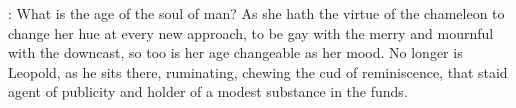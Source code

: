 \documentclass[12pt]{article}
\begin{document}





: What is the age of the soul of man? As she hath the virtue of the
chameleon to change her hue at every new approach, to be gay with the
merry and mournful with the downcast, so too is her age changeable as her
mood. No longer is Leopold, as he sits there, ruminating, chewing the cud
of reminiscence, that staid agent of publicity and holder of a modest
substance in the funds.
\end{document}
